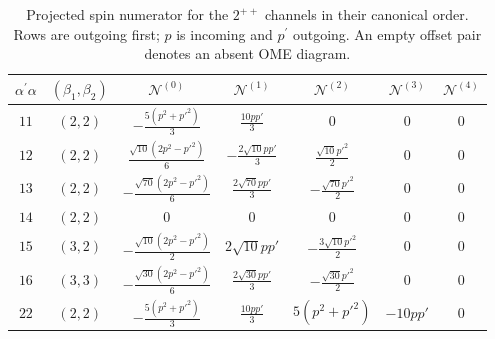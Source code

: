 \documentclass[aps,prl,showpacs,amsmath,onecolumn,superscriptaddress,floatfix,nofootinbib,notitlepage]{revtex4-2}
\begin{document}
\begin{table}[t]
	\caption{Projected spin numerator for the $2^{++}$ channels in their canonical order. Rows are outgoing first; $p$ is incoming and $p^\prime$ outgoing. An empty offset pair denotes an absent OME diagram.}
	\label{tab:projected-spin-numerator-2pp}
	\centering
	\begingroup\footnotesize
	\setlength{\tabcolsep}{3pt}
	\renewcommand{\arraystretch}{1.7}
	\begin{tabular}{cc|ccccc}
		$\alpha^\prime\alpha$ & $(\beta_1,\beta_2)$ & $\mathcal N^{(0)}$                             & $\mathcal N^{(1)}$              & $\mathcal N^{(2)}$                             & $\mathcal N^{(3)}$              & $\mathcal N^{(4)}$               \\ \hline
		$11$                  & $(2,2)$             & $- \frac{5 (p^{2} + p'^{2})}{3}$               & $\frac{10 p p'}{3}$             & $0$                                            & $0$                             & $0$                              \\
		$12$                  & $(2,2)$             & $\frac{\sqrt{10} (2 p^{2} - p'^{2})}{6}$       & $- \frac{2 \sqrt{10} p p'}{3}$  & $\frac{\sqrt{10} p'^{2}}{2}$                   & $0$                             & $0$                              \\
		$13$                  & $(2,2)$             & $- \frac{\sqrt{70} (2 p^{2} - p'^{2})}{6}$     & $\frac{2 \sqrt{70} p p'}{3}$    & $- \frac{\sqrt{70} p'^{2}}{2}$                 & $0$                             & $0$                              \\
		$14$                  & $(2,2)$             & $0$                                            & $0$                             & $0$                                            & $0$                             & $0$                              \\
		$15$                  & $(3,2)$             & $- \frac{\sqrt{10} (2 p^{2} - p'^{2})}{2}$     & $2 \sqrt{10} p p'$              & $- \frac{3 \sqrt{10} p'^{2}}{2}$               & $0$                             & $0$                              \\
		$16$                  & $(3,3)$             & $- \frac{\sqrt{30} (2 p^{2} - p'^{2})}{6}$     & $\frac{2 \sqrt{30} p p'}{3}$    & $- \frac{\sqrt{30} p'^{2}}{2}$                 & $0$                             & $0$                              \\
		$22$                  & $(2,2)$             & $- \frac{5 (p^{2} + p'^{2})}{3}$               & $\frac{10 p p'}{3}$             & $5 (p^{2} + p'^{2})$                           & $- 10 p p'$                     & $0$                              \\

\end{tabular}
\end{table}
\end{document}
